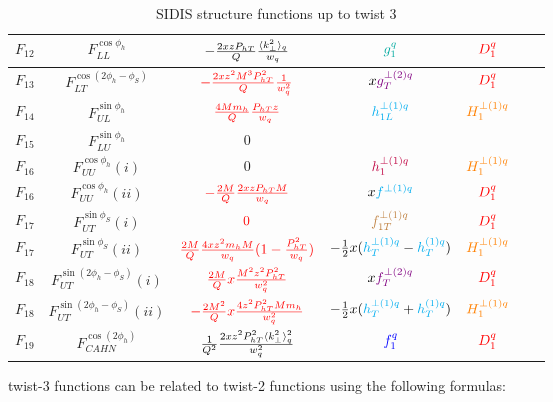 \documentclass[floatfix,aps,prd,nofootinbib,superscriptaddress,preprint]{revtex4}
\newcommand\3[1]{\boldsymbol{#1}}
\newcommand{\Phperp}{P_{hT}}
\begin{document}
\begin{table}[h!]
\begin{tabular}{|c|c|c|c|c|c|c|}
$F_{12}$ & $F_{LL}^{\cos\phi_h}$               & $-\frac{2xz\Phperp}{Q}\frac{\avk}{w_q}$                                                     & $\ppdf$         & ${\color{red} D_1^{q}}$           \\\hline
$F_{13}$ & $F_{LT}^{\cos(2\phi_h -\phi_S)}$    & $\color{red} -\frac{2 x z^2 M^3 \Phperp^2}{Q}\frac{1}{w_q^2}$                                          & $x{\color{violet} g^{\perp(2)q}_{T} }$          & ${\color{red} D_1^{q}}$           \\\hline
$F_{14}$ & $F_{UL}^{\sin\phi_h}$               & $\color{red} \frac{4 M m_h}{Q}  \frac{\Phperp z}{w_q}$                        & ${\color{cyan}h^{\perp (1) q}_{1L}}$          & ${\color{orange} H^{\perp(1)q}_{1} }$      \\\hline
$F_{15}$ & $F_{LU}^{\sin\phi_h}$               & $0$                                                                                         &                 & \\\hline
$F_{16}$ & $F_{UU}^{\cos\phi_h}(i)$            & {\color{red}0} & ${\color{purple} h^{\perp(1)q}_1 }$  & ${\color{orange} H^{\perp(1)q}_{1} }$      \\\hline
$F_{16}$ & $F_{UU}^{\cos\phi_h}(ii)$           & $\color{red} -\frac{2M}{Q} \frac{2 xz\Phperp M}{w_q} $                                                           & $x{\color{cyan}f^{\perp (1) q}}$          & ${\color{red} D_1^{q}} $          \\\hline
$F_{17}$ & $F_{UT}^{\sin\phi_S}(i)$            & ${\color{red}0} $                & ${\color{brown} f^{\perp(1)q}_{1T}}$       & ${\color{red} D_1^{q}}$           \\\hline
$F_{17}$ & $F_{UT}^{\sin\phi_S}(ii)$           & $\color{red} \frac{2M}{Q} \frac{4xz^2 m_h M}{w_q}(1-\frac{\Phperp^2}{w_q}) $                       & $-\frac{1}{2}x({\color{cyan}h^{\perp (1) q}_T}-{\color{cyan}h^{(1) q}_T})$ & ${\color{orange} H^{\perp(1)q}_{1} }$      \\\hline
$F_{18}$ & $F_{UT}^{\sin(2\phi_h-\phi_S)}(i)$  & $\color{red} \frac{2M}{Q} x \frac{M^2 z^2 \Phperp^2}{w_q^2} $                                                   & $x{\color{violet} f^{\perp(2)q}_{T} }$       & ${\color{red} D_1^{q}}$           \\\hline
$F_{18}$ & $F_{UT}^{\sin(2\phi_h-\phi_S)}(ii)$ & $\color{red}-\frac{2M^2}{Q} x \frac{4z^2 \Phperp^2 M m_h}{w_q^2}$                                        & $-\frac{1}{2}x({\color{cyan}h^{\perp (1) q}_T}+{\color{cyan}h^{(1) q}_T})$ & ${\color{orange} H^{\perp(1)q}_{1} }$      \\\hline
$F_{19}$ & $F_{CAHN}^{\cos(2\phi_h)}$          & $\frac{1}{Q^2} \frac{2 x z^2 \Phperp^2 \avk^2}{w_q^2}$                                      & ${\color{blue} f_1^q}$          & ${\color{red} D_1^{q}} $          \\\hline
\end{tabular}
\caption{SIDIS structure functions up to twist 3}
\label{t.chi2}
\end{table}
twist-3 functions can be related to twist-2 functions using the following formulas:
\end{document}
